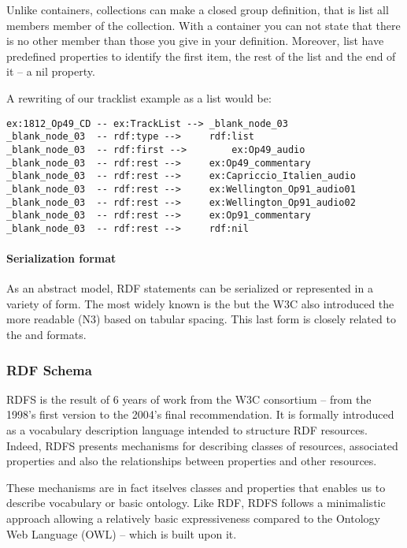 Unlike containers, collections can make a closed group definition, that is list all members member of the collection. With a container you can not state that there  is no other member than those you give in your definition. 
Moreover, list have predefined properties to identify the first item, the rest of the list and the end of it – a nil property. 

A rewriting of our tracklist example as a list would be:
\begin{Verbatim}[fontsize=\small,formatcom=\color{black!70}]
ex:1812_Op49_CD	-- ex:TrackList -->	_blank_node_03
_blank_node_03	-- rdf:type -->		rdf:list
_blank_node_03	-- rdf:first -->		ex:Op49_audio
_blank_node_03	-- rdf:rest -->		ex:Op49_commentary
_blank_node_03	-- rdf:rest -->		ex:Capriccio_Italien_audio
_blank_node_03	-- rdf:rest -->		ex:Wellington_Op91_audio01
_blank_node_03	-- rdf:rest -->		ex:Wellington_Op91_audio02
_blank_node_03	-- rdf:rest -->		ex:Op91_commentary
_blank_node_03	-- rdf:rest -->		rdf:nil
\end{Verbatim}

\paragraph{Serialization format}
As an abstract model, RDF statements can be serialized or represented in a variety of form. The most widely known is the  but the W3C also introduced the more readable  (N3) based on tabular spacing. This last form is closely related to the  and  formats.





\subsubsection{RDF Schema}
RDFS is the result of 6 years of work from the W3C consortium – from the 1998's first version to the 2004's final recommendation. 
It is formally introduced as a vocabulary description language intended to structure RDF resources. 
Indeed, RDFS presents mechanisms for describing classes of resources, associated properties and also the relationships between properties and other resources. 

These mechanisms are in fact itselves classes and properties that enables us to describe vocabulary or basic ontology. 
Like RDF, RDFS follows a minimalistic approach allowing a relatively basic expressiveness compared to the Ontology Web Language (OWL) – which is built upon it.

